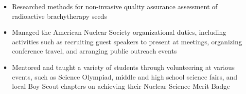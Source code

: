 \begin{minipage}{\textwidth}
	\begin{itemize}
		\item Researched methods for non-invasive quality assurance assessment of radioactive brachytherapy seeds
		\item Managed the American Nuclear Society organizational duties, including activities such as recruiting guest speakers to present at meetings,
			organizing conference travel, and arranging public outreach events
		\item Mentored and taught a variety of students through volunteering at various events, such as Science Olympiad, middle and 
			high school science fairs, and local Boy Scout chapters on achieving their Nuclear Science Merit Badge
	\end{itemize}
\end{minipage}
